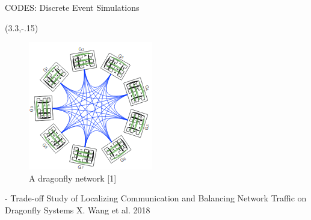 \documentclass{beamer}
\begin{document}
\begin{textblock}{15.6}
\begin{textblock}{5.2}
\begin{block}{\centering CODES: Discrete Event Simulations}
\begin{textblock}{3.3}
      \end{textblock}
      \begin{textblock}{2}(3.3,-.15)
        \begin{figure}
          \centering
          \includegraphics[width=.8\textwidth]{../figures/dragonfly.png}
          \caption{A dragonfly network [1]}
        \end{figure}
      \end{textblock}
      \vspace{13.6cm}
    \end{block}
    \vspace{-.7cm}
    {\fontsize{22}{23} - Trade-off Study of Localizing Communication and Balancing Network Traffic on Dragonfly Systems X. Wang et al. 2018
    }
    

\end{textblock}
\end{textblock}
\end{document}
